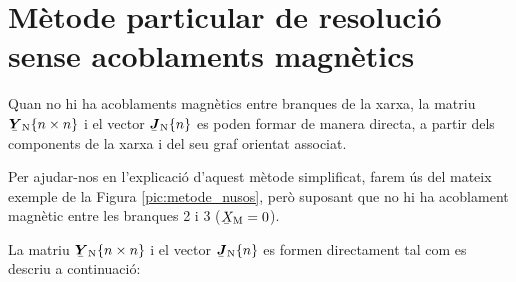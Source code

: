 \section{Mètode particular de resolució sense acoblaments magnètics}

Quan no hi ha acoblaments magnètics entre branques de la xarxa, la matriu $\mcmplx{Y}\ped{N}\{n \times n\}$ i el vector $\mcmplx{J}\ped{N}\{n\}$ es poden formar de manera directa, a partir dels components de la xarxa i del seu graf orientat associat.

Per ajudar-nos en l'explicació d'aquest mètode simplificat, farem ús
del mateix exemple de la Figura \vref{pic:metode_nusos}, però
suposant que no hi ha acoblament magnètic entre les branques 2 i 3
($\cmplx{X}\ped{M}=0$).

La matriu $\mcmplx{Y}\ped{N}\{n \times n\}$ i el vector $\mcmplx{J}\ped{N}\{n\}$ es formen directament tal com es descriu a continuació:

